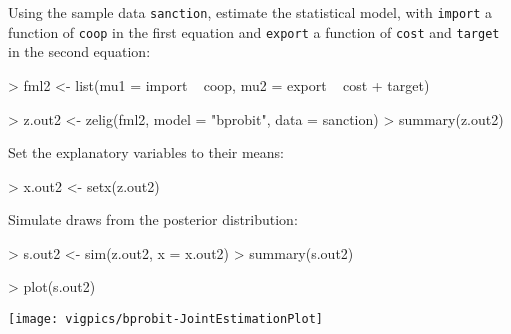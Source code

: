 \begin{enumerate}
Using the sample data \texttt{sanction}, estimate the statistical model, 
with {\tt import} a function of {\tt coop} in the first equation and 
{\tt export} a function of {\tt cost} and {\tt target} in the second equation:
\begin{Schunk}
\begin{Sinput}
> fml2 <- list(mu1 = import ~ coop, mu2 = export ~ cost + target)
\end{Sinput}
\end{Schunk}
\begin{Schunk}
\begin{Sinput}
> z.out2 <- zelig(fml2, model = "bprobit", data = sanction)
> summary(z.out2)
\end{Sinput}
\end{Schunk}
Set the explanatory variables to their means:
\begin{Schunk}
\begin{Sinput}
> x.out2 <- setx(z.out2)
\end{Sinput}
\end{Schunk}
Simulate draws from the posterior distribution:
\begin{Schunk}
\begin{Sinput}
> s.out2 <- sim(z.out2, x = x.out2)
> summary(s.out2)
\end{Sinput}
\end{Schunk}
\begin{center}
\begin{Schunk}
\begin{Sinput}
> plot(s.out2)
\end{Sinput}
\end{Schunk}
\texttt{[image: vigpics/bprobit-JointEstimationPlot]}
\end{center}


%   
% 

\end{enumerate}

